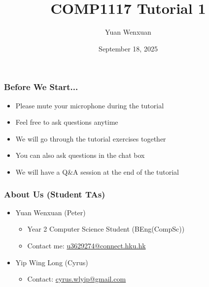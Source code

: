 \documentclass{beamer}
\title{COMP1117 Tutorial 1}
\author{Yuan Wenxuan}
\date{September 18, 2025}
\begin{document}
\frame{\titlepage}

\begin{frame}
    \frametitle{Before We Start...}
    \begin{itemize}
        \item Please mute your microphone during the tutorial
        \item Feel free to ask questions anytime
        \item We will go through the tutorial exercises together
        \item You can also ask questions in the chat box
        \item We will have a Q\&A session at the end of the tutorial
    \end{itemize}
\end{frame}

\begin{frame}
    \frametitle{About Us (Student TAs)}

    \begin{itemize}
        \item Yuan Wenxuan (Peter)
              \begin{itemize}
                  \item Year 2 Computer Science Student (BEng(CompSc))
                  \item Contact me: \href{mailto:u3629274@connect.hku.hk}{u3629274@connect.hku.hk}
              \end{itemize}
        \item Yip Wing Long (Cyrus)
              \begin{itemize}
                  \item Contact: \href{mailto:cyrus.wlyip@gmail.com}{cyrus.wlyip@gmail.com}
              \end{itemize}
    \end{itemize}
\end{frame}
\end{document}
